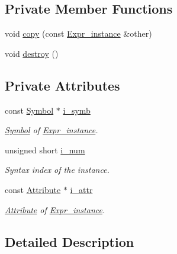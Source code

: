 \subsection*{Private Member Functions}
\begin{DoxyCompactItemize}
\item 
void \hyperlink{classgenevalmag_1_1Expr__instance_ab30d416247a861949c7341fed475a88b}{copy} (const \hyperlink{classgenevalmag_1_1Expr__instance}{Expr\_\-instance} \&other)
\item 
void \hyperlink{classgenevalmag_1_1Expr__instance_aff5a483a323692e96deedecaff680de0}{destroy} ()
\end{DoxyCompactItemize}
\subsection*{Private Attributes}
\begin{DoxyCompactItemize}
\item 
const \hyperlink{classgenevalmag_1_1Symbol}{Symbol} $\ast$ \hyperlink{classgenevalmag_1_1Expr__instance_ac95a446e179a79d7919c4db67b66b7f0}{i\_\-symb}
\begin{DoxyCompactList}\small\item\em \hyperlink{classgenevalmag_1_1Symbol}{Symbol} of \hyperlink{classgenevalmag_1_1Expr__instance}{Expr\_\-instance}. \item\end{DoxyCompactList}\item 
unsigned short \hyperlink{classgenevalmag_1_1Expr__instance_af8d85fabc65cf8133ed5b1f7a6fa925b}{i\_\-num}
\begin{DoxyCompactList}\small\item\em Syntax index of the instance. \item\end{DoxyCompactList}\item 
const \hyperlink{classgenevalmag_1_1Attribute}{Attribute} $\ast$ \hyperlink{classgenevalmag_1_1Expr__instance_a3513fb59dae64c17da188dc3ad10fc53}{i\_\-attr}
\begin{DoxyCompactList}\small\item\em \hyperlink{classgenevalmag_1_1Attribute}{Attribute} of \hyperlink{classgenevalmag_1_1Expr__instance}{Expr\_\-instance}. \item\end{DoxyCompactList}\end{DoxyCompactItemize}


\subsection{Detailed Description}


